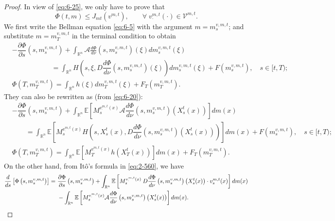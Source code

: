 \documentclass[11pt]{article}
\numberwithin{equation}{section}
\newcommand{\e}{\mathbb{E}}
\newcommand{\brn}{{\mathbb{R}^n}}
\newcommand{\1}{\mbox{1\hspace{-1mm}I}}
\begin{document}
\begin{proof} 
In view of \eqref{eq:6-25}, we only have to prove that 
\begin{equation}\label{eq:6-26}
   \Phi(t,m)\le J_{mt}\left(v^{m,t}\right),\qquad \forall\;v^{m,t}_\cdot(\cdot)\in\mathcal{V}^{m,t}.
\end{equation}
We first write the Bellman equation \eqref{eq:6-5} with the argument $m=m^{v,m,t}_s$; and substitute $m=m^{v,m,t}_T$ in the terminal condition to obtain 
\begin{align*}
    &-\dfrac{\partial \Phi}{\partial s}\left(s,m^{v,m,t}_s\right)+\int_{\brn}\mathcal{A}\frac{d\Phi}{d\nu}\left(s,m^{v,m,t}_s\right)(\xi)dm^{v,m,t}_s(\xi)\\
    &\;\;\ \quad\qquad\qquad =\int_{\brn}H\left(s,\xi,D\dfrac{d\Phi}{d\nu}\left(s,m^{v,m,t}_s\right)(\xi)\right)dm^{v,m,t}_s(\xi)+F\left(m^{v,m,t}_s\right),\quad s\in[t,T);\\
    &\Phi\left(T,m^{v,m,t}_T\right)= \int_{\brn}h(\xi)dm^{v,m,t}_T(\xi)+F_{T}\left(m^{v,m,t}_T\right).
\end{align*}
They can also be rewritten as (from \eqref{eq:6-20}):
\begin{equation}\label{eq:6-28}
    \begin{aligned}
        &-\dfrac{\partial \Phi}{\partial s}\left(s,m^{v,m,t}_s\right)+\int_{\brn}\e \left[M^{v^{m,t}_\cdot(x)}_s\mathcal{A}\dfrac{d\Phi}{d\nu}\left(s,m^{v,m,t}_s\right)\left(X^{t}_s(x)\right)\right]dm(x)\\
        &\qquad =\int_{\brn}\e\left[M^{v^{m,t}_\cdot(x)}_sH\left(s,X^{t}_s(x),D\dfrac{d\Phi}{d\nu}\left(s,m^{v,m,t}_s\right)(X^{t}_s(x))\right)\right]dm(x)+F\left(m^{v,m,t}_s\right),\quad s\in[t,T);\\
        &\Phi\left(T,m^{v,m,t}_T\right)= \int_{\brn} \e  \left[M^{v^{m,t}_\cdot(x)}_T h\left(X^{t}_T(x)\right)\right]dm(x)+F_{T}\left(m^{v,m,t}_T\right).
    \end{aligned}
\end{equation}
On the other hand, from It\^o's formula in \eqref{eq:2-560}, we have
\begin{align}
    \dfrac{d}{ds}\left[\Phi\left(s,m^{v,m,t}_s\right)\right]=\ & \dfrac{\partial \Phi}{\partial s}\left(s,m^{v,m,t}_s\right)+\int_{\brn} \e \left[M^{v^{m,t}_\cdot(x)}_s\:D\dfrac{d\Phi}{d\nu}\left(s,m^{v,m,t}_s\right)\left(X^{t}_s(x)\right)\cdot v^{m,t}_s(x)\right]dm(x) \notag \\
    &-\int_{\brn}\e\left[M^{v^{m,t}_\cdot(x)}_s\mathcal{A}\dfrac{d\Phi}{d\nu}\left(s,m^{v,m,t}_s\right)\left(X^{t}_s(x)\right)\right]dm(x).  \label{eq:6-29}

\end{align}
\end{proof}
\end{document}
